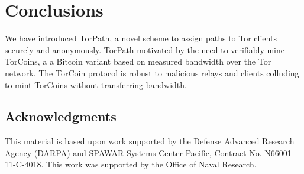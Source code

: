 \section{Conclusions} \label{conc}

We have introduced TorPath, a novel scheme to assign paths to Tor
clients securely and anonymously.
TorPath motivated by the need to verifiably mine TorCoins, a
a Bitcoin variant based on measured bandwidth over the Tor network.
The TorCoin protocol is robust to malicious relays and clients
colluding to mint TorCoins without transferring bandwidth.


\subsection*{Acknowledgments}

This material is based upon work supported by the Defense Advanced Research
Agency (DARPA) and SPAWAR Systems Center Pacific, Contract No. N66001-11-C-4018.
This work was supported by the Office of Naval Research.

